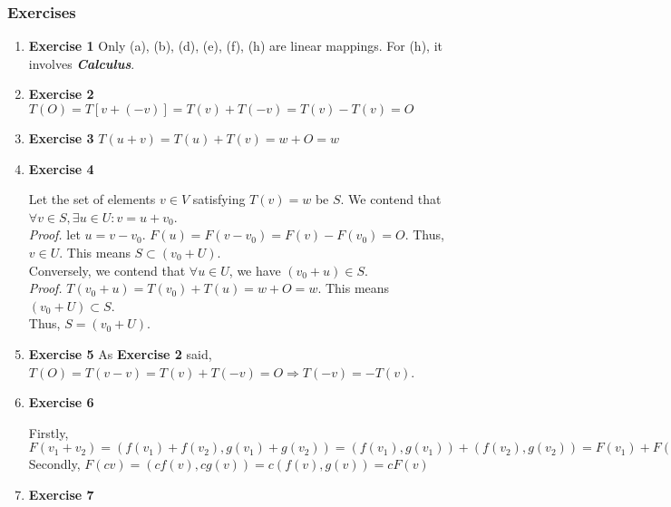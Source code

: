 \documentclass[11pt]{article}
\begin{document}
\subsubsection{Exercises}
\label{sec:orgc2852c6}
\begin{enumerate}
\item \textbf{Exercise 1}
\label{sec:org282cc6a}
Only (a), (b), (d), (e), (f), (h) are linear mappings. For (h), it involves \textbf{\emph{Calculus}}.
\item \textbf{Exercise 2}
\label{sec:org20ca621}
\(T(O)=T[v+(-v)]=T(v)+T(-v)=T(v)-T(v)=O\)
\item \textbf{Exercise 3}
\label{sec:orgc0b227f}
\(T(u+v)=T(u)+T(v)=w+O=w\)
\item \textbf{Exercise 4}
\label{sec:orgb1315f2}

Let the set of elements \(v\in V\) satisfying \(T(v)=w\) be \(S\). We contend that \(\forall v\in S, \exists u\in U:v=u+v_0\).\\
\emph{Proof.} let \(u=v-v_0\). \(F(u)=F(v-v_0)=F(v)-F(v_0)=O\). Thus, \(v\in U\). This means \(S\subset (v_0+U)\).\\
Conversely, we contend that \(\forall u\in U\), we have \((v_0+u)\in S\).\\
\emph{Proof.} \(T(v_0+u)=T(v_0)+T(u)=w+O=w\). This means \((v_0+U)\subset S\).\\
Thus, \(S=(v_0+U)\).
\item \textbf{Exercise 5}
\label{sec:orgfdb3d94}
As \textbf{Exercise 2} said, \(T(O)=T(v-v)=T(v)+T(-v)=O \Rightarrow T(-v)=-T(v)\).
\item \textbf{Exercise 6}
\label{sec:org9e988ee}

Firstly, \(F(v_1+v_2)=(f(v_1)+f(v_2),g(v_1)+g(v_2))=(f(v_1),g(v_1))+(f(v_2),g(v_2))=F(v_1)+F(v_2)\) \\
Secondly, \(F(cv)=(cf(v),cg(v))=c(f(v),g(v))=cF(v)\)
\item \textbf{Exercise 7}
\label{sec:org9974280}
\end{enumerate}
\end{document}
